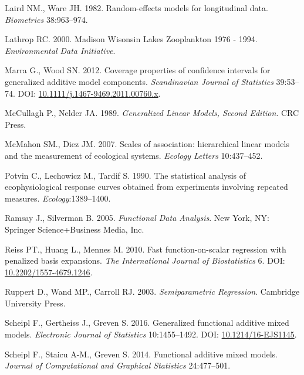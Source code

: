 \documentclass[12pt]{article}
\begin{document}
\hypertarget{ref-laird_random-effects_1982}{}
Laird NM., Ware JH. 1982. Random-effects models for longitudinal data.
\emph{Biometrics} 38:963--974.

\hypertarget{ref-lathrop_madison_2000}{}
Lathrop RC. 2000. Madison Wisonsin Lakes Zooplankton 1976 - 1994.
\emph{Environmental Data Initiative}.

\hypertarget{ref-marra_coverage_2012}{}
Marra G., Wood SN. 2012. Coverage properties of confidence intervals for
generalized additive model components. \emph{Scandinavian Journal of
Statistics} 39:53--74. DOI:
\href{https://doi.org/10.1111/j.1467-9469.2011.00760.x}{10.1111/j.1467-9469.2011.00760.x}.

\hypertarget{ref-McCullagh:1989ti}{}
McCullagh P., Nelder JA. 1989. \emph{Generalized Linear Models, Second
Edition}. CRC Press.

\hypertarget{ref-McMahon:2007ju}{}
McMahon SM., Diez JM. 2007. Scales of association: hierarchical linear
models and the measurement of ecological systems. \emph{Ecology Letters}
10:437--452.

\hypertarget{ref-potvin_statistical_1990}{}
Potvin C., Lechowicz M., Tardif S. 1990. The statistical analysis of
ecophysiological response curves obtained from experiments involving
repeated measures. \emph{Ecology}:1389--1400.

\hypertarget{ref-ramsay_functional_2005}{}
Ramsay J., Silverman B. 2005. \emph{Functional Data Analysis}. New York,
NY: Springer Science+Business Media, Inc.

\hypertarget{ref-reiss_fast_2010}{}
Reiss PT., Huang L., Mennes M. 2010. Fast function-on-scalar regression
with penalized basis expansions. \emph{The International Journal of
Biostatistics} 6. DOI:
\href{https://doi.org/10.2202/1557-4679.1246}{10.2202/1557-4679.1246}.

\hypertarget{ref-Ruppert:2003uc}{}
Ruppert D., Wand MP., Carroll RJ. 2003. \emph{Semiparametric
Regression}. Cambridge University Press.

\hypertarget{ref-scheipl_generalized_2016}{}
Scheipl F., Gertheiss J., Greven S. 2016. Generalized functional
additive mixed models. \emph{Electronic Journal of Statistics}
10:1455--1492. DOI:
\href{https://doi.org/10.1214/16-EJS1145}{10.1214/16-EJS1145}.

\hypertarget{ref-scheipl_functional_2014}{}
Scheipl F., Staicu A-M., Greven S. 2014. Functional additive mixed
models. \emph{Journal of Computational and Graphical Statistics}
24:477--501.
\end{document}
